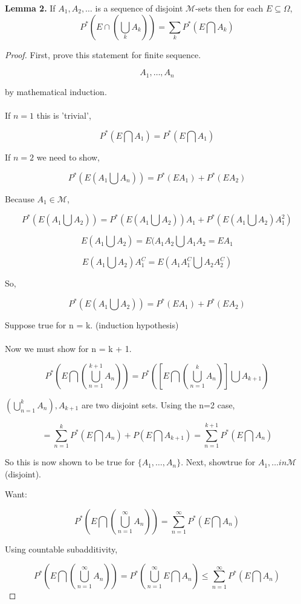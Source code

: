 \documentclass[11pt,fleqn]{book} %
\begin{document}
\textbf{Lemma 2.} If $A_1, A_2, \dots$ is a sequence of disjoint $\mathcal{M}$-sets then for each $E \subseteq \Omega$, 
$$P^*(E\cap(\bigcup_k A_k)) = \displaystyle \sum_k P^*(E \bigcap A_k) $$

\begin{proof}
	First, prove this statement for finite sequence. 

	$$A_1, \dots, A_n $$

	by mathematical induction. \\
	\\

	If $n=1$ this is 'trivial', 

	$$P^*(E\bigcap A_1) = P^*(E \bigcap A_1) $$

	If $n = 2$ we need to show, 

	$$ P^*(E  (A_1 \bigcup A_n)) = P^*(E A_1) + P^*(E A_2)$$

	Because $A_1 \in \mathcal{M}$, 

	$$P^*(E(A_1 \bigcup A_2)) = P^*(E(A_1 \bigcup A_2)) A_1 + P^*(E(A_1 \bigcup A_2)A_1^2)  $$

	$$E(A_1 \bigcup A_2) = E(A_1 A_2 \bigcup A_1 A_2 = EA_1$$

	$$E(A_1 \bigcup A_2) A_1^C = E(A_1 A_1^C \bigcup A_2 A_2^C)$$

	So, 

	$$P^*(E(A_1 \bigcup A_2)) = P^*(EA_1) + P^*(EA_2)$$

Suppose true for n = k. (induction hypothesis) \\
\\
Now we must show for n = k + 1.

$$P^* (E \bigcap (\bigcup_{n=1}^{k+1} A_n)) = P^*([E \bigcap (\bigcup_{n=1}^{k} A_n)] \bigcup A_{k+1}) $$

$ (\bigcup_{n=1}^{k} A_n), A_{k+1}$ are two disjoint sets. Using the n=2 case, 

$$ = \displaystyle \sum_{n=1}^k P^*(E \bigcap A_n) + P(E \bigcap A_{k+1}) = \displaystyle \sum_{n=1}^{k+1} P^*(E \bigcap A_n)  $$

So this is now shown to be true for $\{A_1, \dots, A_n \}$. Next, showtrue for $A_1, \dots in \mathcal{M}$ (disjoint).

Want: 

$$P^*(E \bigcap (\bigcup_{n=1}^\infty A_n)) = \displaystyle \sum_{n=1}^{\infty} P^*(E \bigcap A_n)  $$

Using countable subadditivity, 

$$ P^*(E \bigcap (\bigcup_{n=1}^\infty A_n)) = P^*(\displaystyle \bigcup_{n=1}^{\infty} E \bigcap A_n) \leq \displaystyle \sum_{n=1}^{\infty} P^*(E \bigcap A_n)$$


\end{proof}
\end{document}
